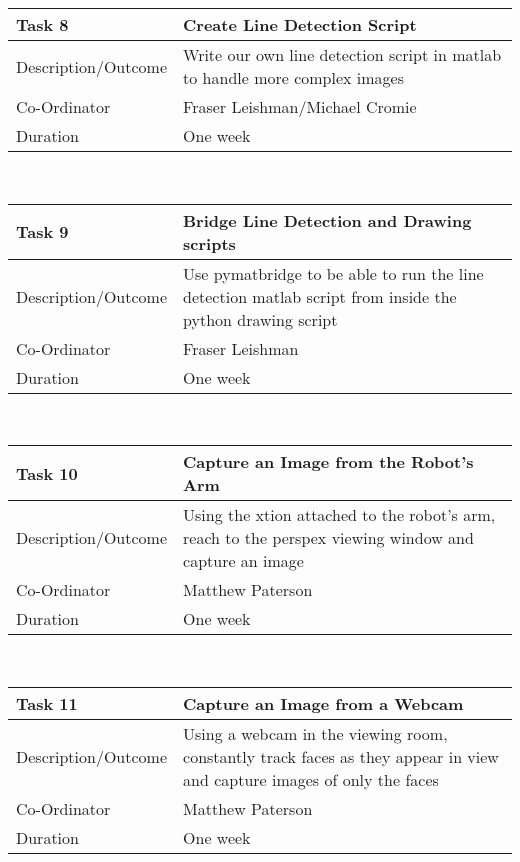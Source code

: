 \documentclass{l3proj}
\begin{document}
\vspace{2mm}

\begin{tabular}{|p{5cm}|p{9cm}|}
\hline
Task 8  & Create Line Detection Script\\
\hline
Description/Outcome & Write our own line detection script in matlab to handle more complex images \\
\hline
Co-Ordinator & Fraser Leishman/Michael Cromie\\
\hline
Duration & One week\\
\hline
\end{tabular}\\

\vspace{2mm}

\begin{tabular}{|p{5cm}|p{9cm}|}
\hline
Task 9 & Bridge Line Detection and Drawing scripts \\
\hline
Description/Outcome & Use pymatbridge to be able to run the line detection matlab script from inside the python drawing script\\
\hline
Co-Ordinator & Fraser Leishman\\
\hline
Duration & One week\\
\hline
\end{tabular}\\

\vspace{2mm}

\begin{tabular}{|p{5cm}|p{9cm}|}
\hline
Task 10 & Capture an Image from the Robot's Arm\\
\hline
Description/Outcome & Using the xtion attached to the robot's arm, reach to the perspex viewing window and capture an image\\
\hline
Co-Ordinator & Matthew Paterson\\
\hline
Duration & One week\\
\hline
\end{tabular}\\

\vspace{2mm}

\begin{tabular}{|p{5cm}|p{9cm}|}
\hline
Task 11 & Capture an Image from a Webcam \\
\hline
Description/Outcome & Using a webcam in the viewing room, constantly track faces as they appear in view and capture images of only the faces\\
\hline
Co-Ordinator & Matthew Paterson\\
\hline
Duration & One week \\
\hline
\end{tabular}\\
\end{document}
